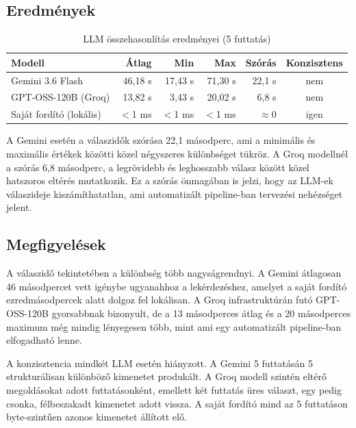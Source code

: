 \documentclass[a4paper,12pt]{article}
\begin{document}
\subsection{Eredmények}

\begin{table}[h]
\centering
\caption{LLM összehasonlítás eredményei (5 futtatás)}
\label{tab:llm-comparison}
\renewcommand{\arraystretch}{1.4}
\small
\begin{tabular}{|l|r|r|r|r|c|}
\hline
\textbf{Modell} & \textbf{Átlag} & \textbf{Min} & \textbf{Max} & \textbf{Szórás} & \textbf{Konzisztens} \\
\hline
Gemini 3.6 Flash      & 46,18 s & 17,43 s & 71,30 s & 22,1 s & nem \\
GPT-OSS-120B (Groq)   & 13,82 s &  3,43 s & 20,02 s &  6,8 s & nem \\
Saját fordító (lokális) & $<$1 ms &  $<$1 ms &  $<$1 ms & $\approx$0 & igen \\
\hline
\end{tabular}
\end{table}

A Gemini esetén a válaszidők szórása 22,1 másodperc, ami a minimális és maximális értékek közötti közel négyszeres különbséget tükröz. A Groq modellnél a szórás 6,8 másodperc, a legrövidebb és leghosszabb válasz között közel hatszoros eltérés mutatkozik. Ez a szórás önmagában is jelzi, hogy az LLM-ek válaszideje kiszámíthatatlan, ami automatizált pipeline-ban tervezési nehézséget jelent.

\subsection{Megfigyelések}

A válaszidő tekintetében a különbség több nagyságrendnyi. A Gemini átlagosan 46 másodpercet vett igénybe ugyanahhoz a lekérdezéshez, amelyet a saját fordító ezredmásodpercek alatt dolgoz fel lokálisan. A Groq infrastruktúrán futó GPT-OSS-120B gyorsabbnak bizonyult, de a 13 másodperces átlag és a 20 másodperces maximum még mindig lényegesen több, mint ami egy automatizált pipeline-ban elfogadható lenne.

A konzisztencia mindkét LLM esetén hiányzott. A Gemini 5 futtatásán 5 strukturálisan különböző kimenetet produkált. A Groq modell szintén eltérő megoldásokat adott futtatásonként, emellett két futtatás üres választ, egy pedig csonka, félbeszakadt kimenetet adott vissza. A saját fordító mind az 5 futtatáson byte-szintűen azonos kimenetet állított elő.
\end{document}
